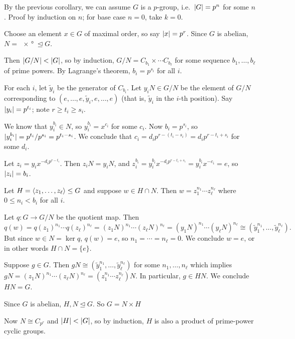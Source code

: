\documentclass[12pt,letterpaper]{report}
\begin{document}
\begin{thmproof}
  By the previous corollary, we can assume $G$ is a $p$-group, i.e.\ $\lvert G\rvert = p^n$ for some $n$.
  Proof by induction on $n$; for base case $n = 0$, take $k = 0$.

  Choose an element $x \in G$ of maximal order, so say $\lvert x\rvert = p^r$.
  Since $G$ is abelian, $N = \ang{x} \trianglelefteq G$.

  Then $\lvert G/N\rvert < \lvert G\rvert$, so by induction, $G/N = C_{b_1} \times \cdots C_{b_\ell}$ for some
  sequence $b_1, \ldots, b_\ell$ of prime powers.
  By Lagrange's theorem, $b_i = p^{s_i}$ for all $i$.

  For each $i$, let $\tilde{y}_i$ be the generator of $C_{b_i}$.
  Let $y_iN \in G/N$ be the element of $G/N$ corresponding to
  $(e, \ldots, e, \tilde{y}_i, e, \ldots, e)$ (that is, $\tilde{y}_i$ in the $i$-th position).
  Say $\lvert y_i\rvert = p^{t_i}$; note $r \geq t_i \geq s_i$.

  We know that $y_i^{b_i} \in N$, so $y_i^{b_i} = x^{c_i}$ for some $c_i$.
  Now $b_i = p^{s_i}$, so $\lvert y_i^{b_i}\rvert = p^{t_i} / p^{s_i} = p^{t_i - s_i}$.
  We conclude that $c_i = d_ip^{r - (t_i - s_i)} = d_ip^{r - t_i + s_i}$ for some $d_i$.

  Let $z_i = y_i x^{-d_ip^{r - t_i}}$.
  Then $z_iN = y_iN$, and $z_i^{b_i} = y_i^{b_i}x^{-d_ip^{r - t_i + s_i}} = y_i^{b_i}x^{-c_i} = e$,
  so $\lvert z_i\rvert = b_i$.

  Let $H = \langle z_1, \ldots, z_\ell\rangle \leq G$ and suppose $w \in H \cap N$.
  Then $w = z_1^{n_1} \cdots z_\ell^{n_\ell}$ where $0 \leq n_i < b_i$ for all $i$.

  Let $q \colon G \to G/N$ be the quotient map.
  Then
  \[
    q(w) = q(z_1)^{n_1} \cdots q(z_\ell)^{n_\ell} = (z_1N)^{n_1} \cdots (z_\ell N)^{n_\ell}
    = (y_1N)^{n_1} \cdots (y_\ell N)^{n_\ell}
    \cong (\tilde{y}_1^{n_1}, \ldots, \tilde{y}_\ell^{n_\ell}).
  \]
  But since $w \in N = \ker q$, $q(w) = e$, so $n_1 = \cdots = n_\ell = 0$.
  We conclude $w = e$, or in other words $H \cap N = \{e\}$.

  Suppose $g \in G$.
  Then $gN \cong (\tilde{y}_1^{n_1}, \ldots, \tilde{y}_\ell^{n_\ell})$ for some
  $n_1, \ldots, n_\ell$ which implies $gN = (z_1N)^{n_1} \cdots (z_\ell N)^{n_\ell}
    = (z_1^{n_1} \cdots z_\ell^{n_\ell})N$.
  In particular, $g \in HN$.
  We conclude $HN = G$.

  Since $G$ is abelian, $H, N \trianglelefteq G$.
  So $G = N \times H$

  Now $N \cong C_{p^r}$ and $\lvert H\rvert < \lvert G\rvert$, so by induction, $H$ is also a product of
  prime-power cyclic groups.
\end{thmproof}
\end{document}
